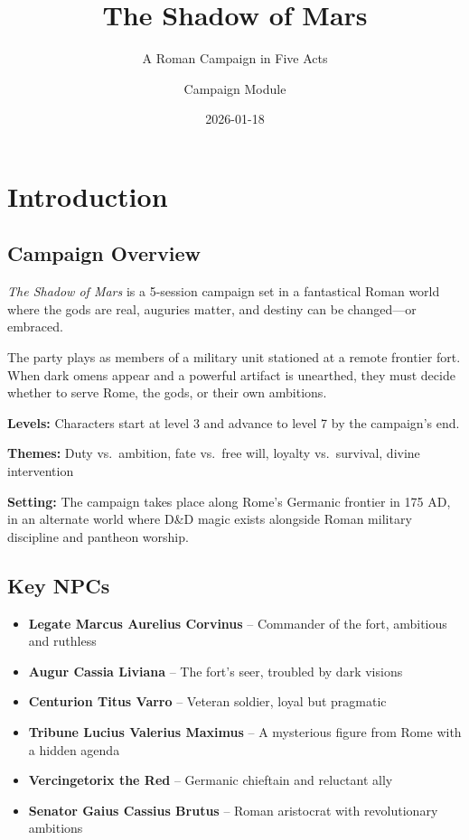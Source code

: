 \documentclass[
]{book}
\title{The Shadow of Mars}
\subtitle{A Roman Campaign in Five Acts}
\author{Campaign Module}
\date{2026-01-18}
\providecommand{\tightlist}{%
  \setlength{\itemsep}{0pt}\setlength{\parskip}{0pt}}
\begin{document}
\frontmatter
\maketitle


\mainmatter
\chapter{Introduction}\label{introduction}

\section{Campaign Overview}\label{campaign-overview}

\emph{The Shadow of Mars} is a 5-session campaign set in a fantastical
Roman world where the gods are real, auguries matter, and destiny can be
changed---or embraced.

The party plays as members of a military unit stationed at a remote
frontier fort. When dark omens appear and a powerful artifact is
unearthed, they must decide whether to serve Rome, the gods, or their
own ambitions.

\textbf{Levels:} Characters start at level 3 and advance to level 7 by
the campaign's end.

\textbf{Themes:} Duty vs.~ambition, fate vs.~free will, loyalty
vs.~survival, divine intervention

\textbf{Setting:} The campaign takes place along Rome's Germanic
frontier in 175 AD, in an alternate world where D\&D magic exists
alongside Roman military discipline and pantheon worship.

\section{Key NPCs}\label{key-npcs}

\begin{itemize}
\tightlist
\item
  \textbf{Legate Marcus Aurelius Corvinus} -- Commander of the fort,
  ambitious and ruthless
\item
  \textbf{Augur Cassia Liviana} -- The fort's seer, troubled by dark
  visions
\item
  \textbf{Centurion Titus Varro} -- Veteran soldier, loyal but pragmatic
\item
  \textbf{Tribune Lucius Valerius Maximus} -- A mysterious figure from
  Rome with a hidden agenda
\item
  \textbf{Vercingetorix the Red} -- Germanic chieftain and reluctant
  ally
\item
  \textbf{Senator Gaius Cassius Brutus} -- Roman aristocrat with
  revolutionary ambitions
\end{itemize}
\end{document}

